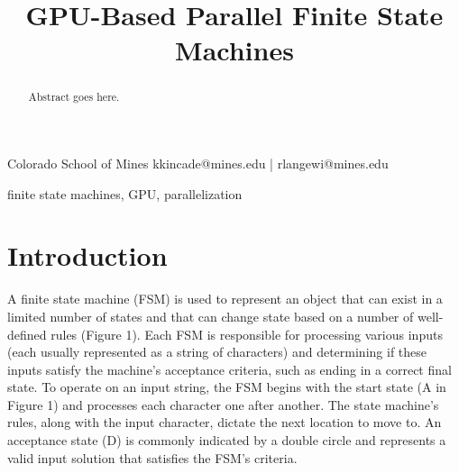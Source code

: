 \documentclass{sigplanconf}
\begin{document}
\setlength{\pdfpageheight}{\paperheight}
\setlength{\pdfpagewidth}{\paperwidth}






\title{GPU-Based Parallel Finite State Machines}

           {Colorado School of Mines}
           {kkincade@mines.edu | rlangewi@mines.edu}

\maketitle

\begin{abstract}
Abstract goes here.
\end{abstract}

\terms
finite state machines, GPU, parallelization

\section{Introduction}

A finite state machine (FSM) is used to represent an object that can exist in a limited number of states and that can change state based on a number of well-defined rules (Figure 1). Each FSM is responsible for processing various inputs (each usually represented as a string of characters) and determining if these inputs satisfy the machine's acceptance criteria, such as ending in a correct final state. To operate on an input string, the FSM begins with the start state (A in Figure 1) and processes each character one after another. The state machine's rules, along with the input character, dictate the next location to move to. An acceptance state (D) is commonly indicated by a double circle and represents a valid input solution that satisfies the FSM's criteria.
\end{document}
